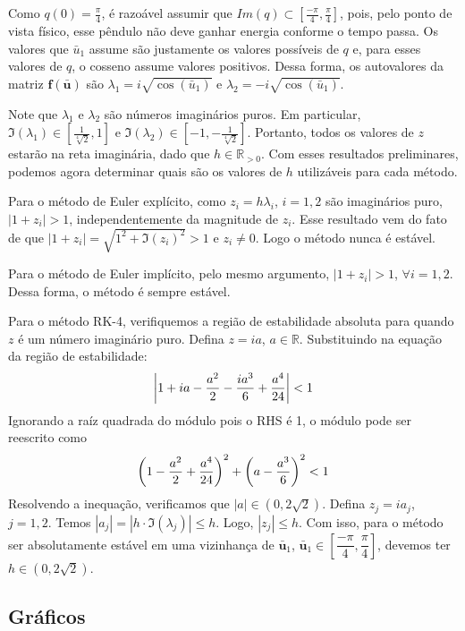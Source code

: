 \documentclass{article}
\newcommand{\bd}[1]{\mathbf{#1}} %
\newcommand{\bb}[1]{\bar{\mathbf{#1}}} %
\begin{document}
    Como $q(0) = \frac{\pi}{4}$, é razoável assumir que $Im(q) \subset \left[\frac{-\pi}{4}, \frac{\pi}{4}\right]$, pois, pelo ponto de vista físico, esse pêndulo não deve ganhar energia conforme o tempo passa. Os valores que $\bar{u}_1$ assume são justamente os valores possíveis de $q$ e, para esses valores de $q$, o cosseno assume valores positivos. Dessa forma, os autovalores da matriz $\bd{f}(\bb{u})$ são $\lambda_1 = i \sqrt{\cos(\bar{u}_1)}$ e $\lambda_2 = -i \sqrt{\cos(\bar{u}_1)}$. 

    Note que $\lambda_1$ e $\lambda_2$ são números imaginários puros. Em particular, $\Im(\lambda_1) \in \left[ \frac{1}{\sqrt[4]{2}}, 1\right]$ e $\Im(\lambda_2) \in \left[-1, -\frac{1}{\sqrt[4]{2}}\right]$. Portanto, todos os valores de $z$ estarão na reta imaginária, dado que $h\in \mathbb{R}_{>0}$. Com esses resultados preliminares, podemos agora determinar quais são os valores de $h$ utilizáveis para cada método.

    Para o método de Euler explícito, como $z_i = h\lambda_i$, $i=1,2$ são imaginários puro, $|1 + z_i| > 1$, independentemente da magnitude de $z_i$. Esse resultado vem do fato de que $|1 + z_i| = \sqrt{1^2 + \Im(z_i)^2} > 1$ e $z_i \ne 0$. Logo o método nunca é estável.

    Para o método de Euler implícito, pelo mesmo argumento, $|1+ z_i| > 1$, $\forall i=1,2$. Dessa forma, o método é sempre estável.

    Para o método RK-4, verifiquemos a região de estabilidade absoluta para quando $z$ é um número imaginário puro. Defina $z=ia$, $a \in \mathbb{R}$. Substituindo na equação da região de estabilidade:
    \begin{align}
        \left|1 + ia - \dfrac{a^2}{2} - \dfrac{ia^3}{6} + \dfrac{a^4}{24}\right| < 1 \notag
    \end{align}
    Ignorando a raíz quadrada do módulo pois o RHS é 1, o módulo pode ser reescrito como
    \begin{align}
        \left(1-\dfrac{a^2}{2} + \dfrac{a^4}{24}\right)^2 + \left(a - \dfrac{a^3}{6}\right)^2 < 1 \notag
    \end{align}
    Resolvendo a inequação, verificamos que $|a| \in (0, 2\sqrt{2})$. Defina $z_j = ia_j$, $j=1,2$. Temos $|a_j| = |h \cdot \Im(\lambda_j)| \le h$. Logo, $|z_j| \le h$. Com isso, para o método ser absolutamente estável em uma vizinhança de $\bb{u}_1$, $\bb{u}_1 \in \left[\dfrac{-\pi}{4}, \dfrac{\pi}{4}\right]$, devemos ter $h \in (0, 2\sqrt{2})$. 
 
    \subsection{Gráficos}
\end{document}
